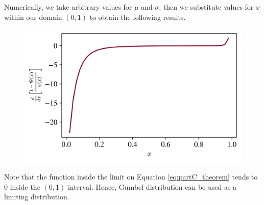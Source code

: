 Numerically, we take arbitrary values for $\mu$ and $\sigma$, then we substitute values for $x$ within our domain $(0,1)$ to obtain the following results.

\begin{figure}[htbp!]
\centering
\includegraphics{images/th1052_gumbel_verify.png}
\label{fig:gumbel_verify}
\end{figure}

Note that the function inside the limit on Equation \ref{eq:partC_theorem} tends to $0$ inside the $(0,1)$ interval. Hence, Gumbel distribution can be used as a limiting distribution.